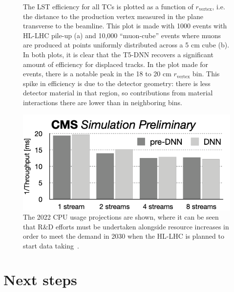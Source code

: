 \begin{figure}[!htb]
  \centering
  \qquad
  \caption{
      The LST efficiency for all TCs is plotted as a function of $r_\text{vertex}$, i.e. the distance to the production vertex measured in the plane transverse to the beamline.
      This plot is made with 1000 \ttbar events with HL-LHC pile-up (a) and 10,000 ``muon-cube'' events where muons are produced at points uniformly distributed across a 5 cm cube (b).
      In both plots, it is clear that the T5-DNN recovers a significant amount of efficiency for displaced tracks.
      In the plot made for \ttbar events, there is a notable peak in the 18 to 20 cm $r_\text{vertex}$ bin.
      This spike in efficiency is due to the detector geometry: there is less detector material in that region, so contributions from material interactions there are lower than in neighboring bins.
  }
\end{figure}

\begin{figure}[!htb]
  \centering
  \includegraphics[width=0.85\linewidth]{fig/lst/throughput_vs_streams.pdf}
  \caption{The 2022 CPU usage projections are shown, where it can be seen that R\&D efforts must be undertaken alongside resource increases in order to meet the demand in 2030 when the HL-LHC is planned to start data taking~\cite{CMS-NOTE-2022-008}.}
  \label{fig:streams-vs-throughput}
\end{figure}

\section{Next steps}
